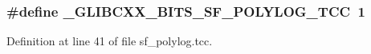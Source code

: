 \subsubsection[{\+\_\+\+G\+L\+I\+B\+C\+X\+X\+\_\+\+B\+I\+T\+S\+\_\+\+S\+F\+\_\+\+P\+O\+L\+Y\+L\+O\+G\+\_\+\+T\+C\+C}]{\setlength{\rightskip}{0pt plus 5cm}\#define \+\_\+\+G\+L\+I\+B\+C\+X\+X\+\_\+\+B\+I\+T\+S\+\_\+\+S\+F\+\_\+\+P\+O\+L\+Y\+L\+O\+G\+\_\+\+T\+C\+C~1}\label{sf__polylog_8tcc_ab6c10ff949c404f48f72645a3fe8a674}


Definition at line 41 of file sf\+\_\+polylog.\+tcc.

